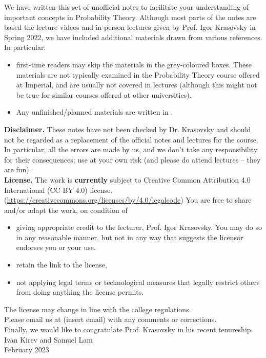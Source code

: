 \thispagestyle{empty}
We have written this set of unofficial notes to facilitate your understanding of important concepts in Probability Theory. Although most parts of the notes are based the lecture videos and in-person lectures given by Prof. Igor Krasovsky in Spring 2022, we have included additional materials drawn from various references. In particular: 

\begin{unexaminable}
\begin{itemize}
    \item first-time readers may skip the materials in the grey-coloured boxes. These materials are not typically examined in the Probability Theory course offered at Imperial, and are usually not covered in lectures (although this might not be true for similar courses offered at other universities).
\end{itemize}
\end{unexaminable}
\begin{itemize}
    \item Any unfinished/planned materials are written in .
\end{itemize}

\textbf{Disclaimer.} These notes have not been checked by Dr. Krasovsky and should not be regarded as a replacement of the official notes and lectures for the course. In particular, all the errors are made by us, and we don't take any responsibility for their consequences; use at your own risk (and please do attend lectures -- they are fun). \\

\textbf{License.} The work is \textbf{currently} subject to Creative Common Attribution 4.0 International (CC BY 4.0) license. (\url{https://creativecommons.org/licenses/by/4.0/legalcode}) You are free to share and/or adapt the work, on condition of 
\begin{itemize}
    \item giving appropriate credit to the lecturer, Prof. Igor Krasovsky. You may do so in any reasonable manner, but not in any way that suggests the licensor endorses you or your use.
    \item retain the link to the license,
    \item not applying legal terms or technological measures that legally restrict others from doing anything the license permits.
\end{itemize}
The license may change in line with the college regulations.\\

Please email us at (insert email) with any comments or corrections.\\

Finally, we would like to congratulate Prof. Krasovsky in his recent tenureship.\\

Ivan Kirev and Samuel Lam \\
February 2023

\newpage 

\tableofcontents
\newpage

\pagestyle{fancy}

